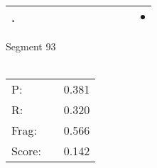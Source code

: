 \documentclass[landscape]{article}
\newcommand{\ssp}{\hspace{2pt}}
\newcommand{\mex}{\cellcolor{g}$\bullet$}
\begin{document}
\begin{tabular}{|l|p{10pt}|p{10pt}|p{10pt}|p{10pt}|p{10pt}|p{10pt}|p{10pt}|p{10pt}|p{10pt}|p{10pt}|p{10pt}|}
\hline
\ssp \cellcolor{ref10}. \ssp&\hspace{2pt}&\hspace{2pt}&\hspace{2pt}&\hspace{2pt}&\hspace{2pt}&\hspace{2pt}&\hspace{2pt}&\hspace{2pt}&\hspace{2pt}&\hspace{2pt}&\hspace{2pt}\mex\\
\hline
\end{tabular}

\vspace{6pt}
\noindent Segment 93\\\\
\noindent\begin{tabular}{lm{12pt}r}
\hline
P:&&0.381\\
R:&&0.320\\
Frag:&&0.566\\
Score:&&0.142\\
\end{tabular}

\newpage
\end{document}
